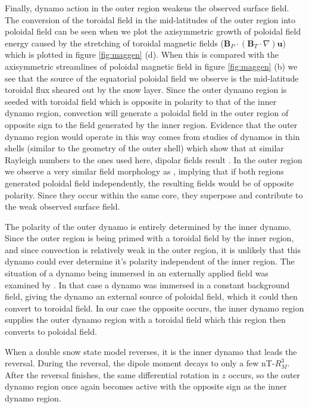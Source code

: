 Finally, dynamo action in the outer region weakens the observed surface field. The conversion of the toroidal field in the mid-latitudes of the outer region into poloidal field can be seen when we plot the axisymmetric growth of poloidal field energy caused by the stretching of toroidal magnetic fields ($\overline{\mathbf{B}_{P}\cdot\left(\mathbf{B}_{T}\cdot\nabla\right)\mathbf{u}}$) which is plotted in figure \ref{fig:maggen} (d). When this is compared with the axisymmetric streamlines of poloidal magnetic field in figure \ref{fig:maggen} (b) we see that the source of the equatorial poloidal field we observe is the mid-latitude toroidal flux sheared out by the snow layer. Since the outer dynamo region is seeded with toroidal field which is opposite in polarity to that of the inner dynamo region, convection will generate a poloidal field in the outer region of opposite sign to the field generated by the inner region. Evidence that the outer dynamo region would operate in this way comes from studies of dynamos in thin shells (similar to the geometry of the outer shell) which show that at similar Rayleigh numbers to the ones used here, dipolar fields result \citep{stanleyandmohammadi}. In the outer region we observe a very similar field morphology as \citet{stanleyandmohammadi}, implying that if both regions generated poloidal field independently, the resulting fields would be of opposite polarity. Since they occur within the same core, they superpose and contribute to the weak observed surface field. 

The polarity of the outer dynamo is entirely determined by the inner dynamo. Since the outer region is being primed with a toroidal field by the inner region, and since convection is relatively weak in the outer region, it is unlikely that this dynamo could ever determine it's polarity independent of the inner region. The situation of a dynamo being immersed in an externally applied field was examined by \citet{sarson97}. In that case a dynamo was immersed in a constant background field, giving the dynamo an external source of poloidal field, which it could then convert to toroidal field. In our case the opposite occurs, the inner dynamo region supplies the outer dynamo region with a toroidal field which this region then converts to poloidal field. 

When a double snow state model reverses, it is the inner dynamo that leads the reversal. During the reversal, the dipole moment decays to only a few nT-$R_{M}^3$. After the reversal finishes, the same differential rotation in $z$ occurs, so the outer dynamo region once again becomes active with the opposite sign as the inner dynamo region. 

